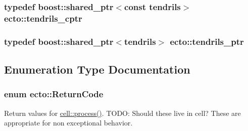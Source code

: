 \subsubsection[{tendrils\+\_\+cptr}]{\setlength{\rightskip}{0pt plus 5cm}typedef boost\+::shared\+\_\+ptr$<$const {\bf tendrils}$>$ {\bf ecto\+::tendrils\+\_\+cptr}}\label{namespaceecto_a6165b23b34082cfc17104ca7e9f1b212}
\hypertarget{namespaceecto_a89953a225525948cb71d5488c3c6472b}{}
\subsubsection[{tendrils\+\_\+ptr}]{\setlength{\rightskip}{0pt plus 5cm}typedef boost\+::shared\+\_\+ptr$<${\bf tendrils}$>$ {\bf ecto\+::tendrils\+\_\+ptr}}\label{namespaceecto_a89953a225525948cb71d5488c3c6472b}


\subsection{Enumeration Type Documentation}
\hypertarget{namespaceecto_a93d82cd28db695d53963fb696582762c}{}
\subsubsection[{Return\+Code}]{\setlength{\rightskip}{0pt plus 5cm}enum {\bf ecto\+::\+Return\+Code}}\label{namespaceecto_a93d82cd28db695d53963fb696582762c}


Return values for \hyperlink{structecto_1_1cell_a6b810671ee21f5dddbc1206abfb999f3}{cell\+::process()}. T\+O\+D\+O\+: Should these live in cell? These are appropriate for non exceptional behavior. 

